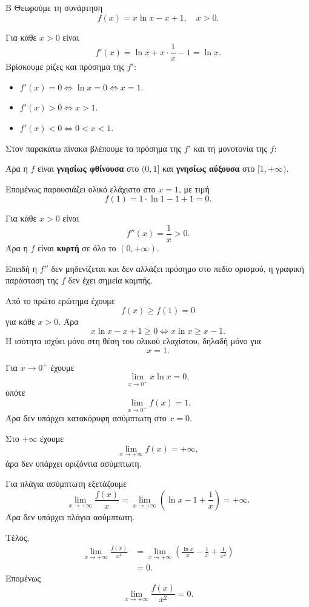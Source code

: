 \begin{thema}{Β}
Θεωρούμε τη συνάρτηση
\[
f(x)=x\ln x-x+1,\quad x>0.
\]
\begin{erwthma}
\item Για κάθε $x>0$ είναι
\[
f'(x)=\ln x+x\cdot\frac{1}{x}-1=\ln x.
\]
Βρίσκουμε ρίζες και πρόσημα της $f'$:
\begin{itemize}
\item $f'(x)=0\Leftrightarrow \ln x=0\Leftrightarrow x=1$.
\item $f'(x)>0\Leftrightarrow x>1$.
\item $f'(x)<0\Leftrightarrow 0<x<1$.
\end{itemize}
Στον παρακάτω πίνακα βλέπουμε τα πρόσημα της $f'$ και τη μονοτονία της $f$:
\begin{center}
\end{center}
Άρα η $f$ είναι \textbf{γνησίως φθίνουσα} στο $(0,1]$ και \textbf{γνησίως αύξουσα} στο $[1,+\infty)$.

Επομένως παρουσιάζει ολικό ελάχιστο στο $x=1$, με τιμή
\[
f(1)=1\cdot\ln1-1+1=0.
\]

\item Για κάθε $x>0$ είναι
\[
f''(x)=\frac{1}{x}>0.
\]
Άρα η $f$ είναι \textbf{κυρτή} σε όλο το $(0,+\infty)$.

Επειδή η $f''$ δεν μηδενίζεται και δεν αλλάζει πρόσημο στο πεδίο ορισμού, η γραφική παράσταση της $f$ δεν έχει σημεία καμπής.

\item Από το πρώτο ερώτημα έχουμε
\[
f(x)\geq f(1)=0
\]
για κάθε $x>0$. Άρα
\[
x\ln x-x+1\geq0
\Leftrightarrow
x\ln x\geq x-1.
\]
Η ισότητα ισχύει μόνο στη θέση του ολικού ελαχίστου, δηλαδή μόνο για
\[
{x=1}.
\]

\item Για $x\to0^+$ έχουμε
\[
\lim_{x\to0^+}x\ln x=0,
\]
οπότε
\[
\lim_{x\to0^+}f(x)=1.
\]
Άρα δεν υπάρχει κατακόρυφη ασύμπτωτη στο $x=0$.

Στο $+\infty$ έχουμε
\[
\lim_{x\to+\infty}f(x)=+\infty,
\]
άρα δεν υπάρχει οριζόντια ασύμπτωτη.

Για πλάγια ασύμπτωτη εξετάζουμε
\[
\lim_{x\to+\infty}\frac{f(x)}{x}
=\lim_{x\to+\infty}\left(\ln x-1+\frac{1}{x}\right)=+\infty.
\]
Άρα δεν υπάρχει πλάγια ασύμπτωτη.

Τέλος,
\begin{align*}
\lim_{x\to+\infty}\frac{f(x)}{x^2}
&=\lim_{x\to+\infty}\left(\frac{\ln x}{x}-\frac{1}{x}+\frac{1}{x^2}\right)\\
&=0.
\end{align*}
Επομένως
\[
{\lim_{x\to+\infty}\frac{f(x)}{x^2}=0}.
\]
\end{erwthma}
\end{thema}

